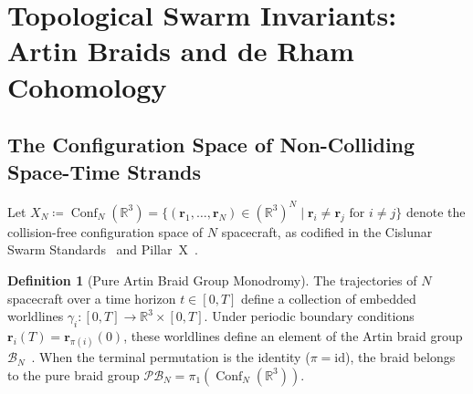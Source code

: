 \documentclass[11pt,a4paper,reqno]{article}
\theoremstyle{plain}
\theoremstyle{definition}
\newtheorem{definition}[theorem]{Definition}
\theoremstyle{remark}
\numberwithin{equation}{section}
\newcommand{\R}{\mathbb{R}}
\begin{document}
\section{Topological Swarm Invariants: Artin Braids and de Rham Cohomology}
\label{sec:topological_swarms}

\subsection{The Configuration Space of Non-Colliding Space-Time Strands}
Let $X_N \coloneqq \operatorname{Conf}_N(\R^3) = \{ (\mathbf{r}_1, \dots, \mathbf{r}_N) \in (\R^3)^N \mid \mathbf{r}_i \neq \mathbf{r}_j \text{ for } i \neq j \}$ denote the collision-free configuration space of $N$ spacecraft, as codified in the Cislunar Swarm Standards~\cite{CislunarSwarmV11} and Pillar~X~\cite{PillarXPreprint}.

\begin{definition}[Pure Artin Braid Group Monodromy]
The trajectories of $N$ spacecraft over a time horizon $t \in [0, T]$ define a collection of embedded worldlines $\gamma_i : [0, T] \to \R^3 \times [0, T]$. Under periodic boundary conditions $\mathbf{r}_i(T) = \mathbf{r}_{\pi(i)}(0)$, these worldlines define an element of the Artin braid group $\mathcal{B}_N$~\cite{artin1947}. When the terminal permutation is the identity ($\pi = \mathrm{id}$), the braid belongs to the pure braid group $\mathcal{P}\mathcal{B}_N = \pi_1(\operatorname{Conf}_N(\R^3))$.
\end{definition}
\end{document}
